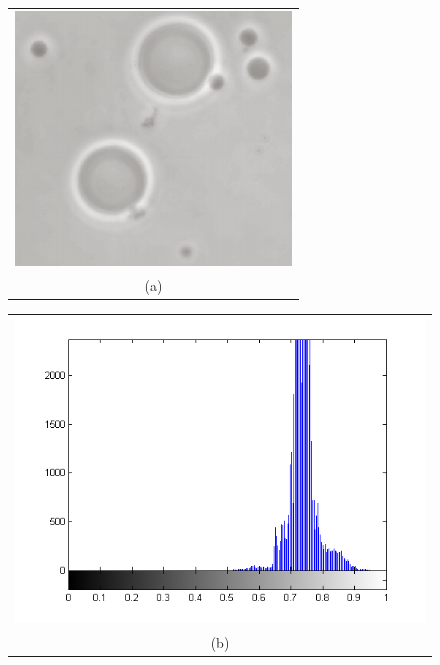 \begin{figure}[h!]
\centering
\begin{minipage}{.45\textwidth}
\begin{tabular}{c}
\includegraphics[width=.9\textwidth]{segmentation/NotSegmented} \\
(a)
\end{tabular}
\end{minipage}
\begin{minipage}{.45\textwidth}
\begin{tabular}{c}
\includegraphics[width=.9\textwidth]{segmentation/NotSegmentedHist} \\
(b)
\end{tabular}
\end{minipage}

\end{figure}
